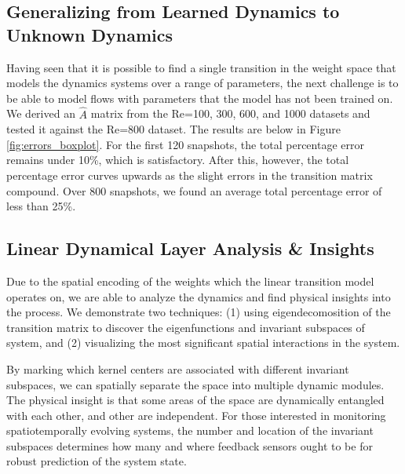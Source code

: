 \documentclass[letterpaper,12pt,peerreviewca,draftcls]{IEEEtran}
\newcommand{\dualop}{A}
\newcommand{\dualopApprox}{\widehat{\dualop}}
\begin{document}
\subsection{Generalizing from Learned Dynamics to Unknown Dynamics}\label{sec:generalize}

Having seen that it is possible to find a single transition in the weight space that models the dynamics systems over a range of parameters, the next challenge is to be able to model flows with parameters that the model has not been trained on. We derived an $\dualopApprox$ matrix from the Re=100, 300, 600, and 1000 datasets and tested it against the Re=800 dataset. The results are below in Figure \ref{fig:errors_boxplot}. For the first 120 snapshots, the total percentage error remains under 10\%, which is satisfactory. After this, however, the total percentage error curves upwards as the slight errors in the transition matrix compound. Over 800 snapshots, we found an average total percentage error of less than 25\%. 

\subsection{Linear Dynamical Layer Analysis \& Insights}\label{sec:analysis}
Due to the spatial encoding of the weights which the linear transition model operates on, we are able to analyze the dynamics and find physical insights into the process. We demonstrate two techniques: (1) using eigendecomosition of the transition matrix to discover the eigenfunctions and invariant subspaces of system, and (2) visualizing the most significant spatial interactions in the system.

By marking which kernel centers are associated with different invariant subspaces, we can spatially separate the space into multiple dynamic modules. The physical insight is that some areas of the space are dynamically entangled with each other, and other are independent. For those interested in monitoring spatiotemporally evolving systems, the number and location of the invariant subspaces determines how many and where feedback sensors ought to be for robust prediction of the system state.
\end{document}
